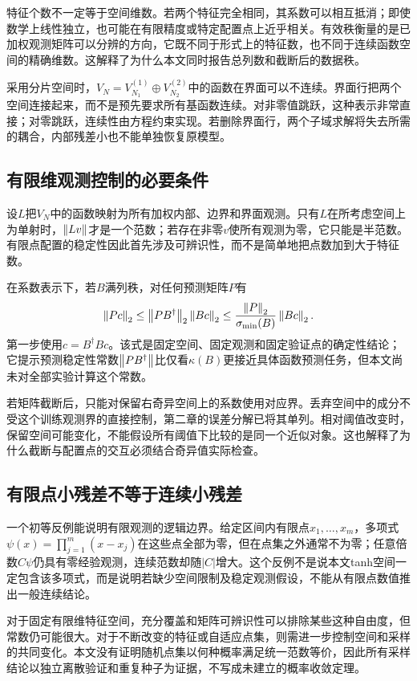 特征个数不一定等于空间维数。若两个特征完全相同，其系数可以相互抵消；即使数学上线性独立，也可能在有限精度或特定配置点上近乎相关。有效秩衡量的是已加权观测矩阵可以分辨的方向，它既不同于形式上的特征数，也不同于连续函数空间的精确维数。这解释了为什么本文同时报告总列数和截断后的数据秩。

采用分片空间时，$V_N=V_{N_1}^{(1)}\oplus V_{N_2}^{(2)}$中的函数在界面可以不连续。界面行把两个空间连接起来，而不是预先要求所有基函数连续。对非零值跳跃，这种表示非常直接；对零跳跃，连续性由方程约束实现。若删除界面行，两个子域求解将失去所需的耦合，内部残差小也不能单独恢复原模型。

\subsection{有限维观测控制的必要条件}
设$L$把$V_N$中的函数映射为所有加权内部、边界和界面观测。只有$L$在所考虑空间上为单射时，$\left\lVert Lv\right\rVert$才是一个范数；若存在非零$v$使所有观测为零，它只能是半范数。有限点配置的稳定性因此首先涉及可辨识性，而不是简单地把点数加到大于特征数。

在系数表示下，若$B$满列秩，对任何预测矩阵$P$有
\begin{equation}\label{eq:prediction_bound}
\left\lVert Pc\right\rVert_2\le\left\lVert PB^\dagger\right\rVert_2\left\lVert Bc\right\rVert_2
\le\frac{\left\lVert P\right\rVert_2}{\sigma_{\min}(B)}\left\lVert Bc\right\rVert_2.
\end{equation}
第一步使用$c=B^\dagger Bc$。该式是固定空间、固定观测和固定验证点的确定性结论；它提示预测稳定性常数$\left\lVert PB^\dagger\right\rVert$比仅看$\kappa(B)$更接近具体函数预测任务，但本文尚未对全部实验计算这个常数。

若矩阵截断后，只能对保留右奇异空间上的系数使用对应界。丢弃空间中的成分不受这个训练观测界的直接控制，第二章的误差分解已将其单列。相对阈值改变时，保留空间可能变化，不能假设所有阈值下比较的是同一个近似对象。这也解释了为什么截断与配置点的交互必须结合奇异值实际检查。

\subsection{有限点小残差不等于连续小残差}
一个初等反例能说明有限观测的逻辑边界。给定区间内有限点$x_1,\ldots,x_m$，多项式$\psi(x)=\prod_{j=1}^m(x-x_j)$在这些点全部为零，但在点集之外通常不为零；任意倍数$C\psi$仍具有零经验观测，连续范数却随$|C|$增大。这个反例不是说本文tanh空间一定包含该多项式，而是说明若缺少空间限制及稳定观测假设，不能从有限点数值推出一般连续结论。

对于固定有限维特征空间，充分覆盖和矩阵可辨识性可以排除某些这种自由度，但常数仍可能很大。对于不断改变的特征或自适应点集，则需进一步控制空间和采样的共同变化。本文没有证明随机点集以何种概率满足统一范数等价，因此所有采样结论以独立离散验证和重复种子为证据，不写成未建立的概率收敛定理。
